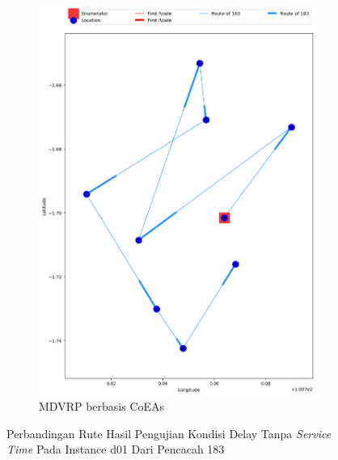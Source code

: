 \begin{figure}[H]
	\centering
	\begin{subfigure}[t]{\textwidth}
		\centering
		\includegraphics[width=\textwidth]{Resources/Images/delayed_1/real_m15_n100_delayed_1_183_coes}
		\caption{MDVRP berbasis CoEAs}
		\label{fig:real_m15_n100_delayed_1_183_coes}
	\end{subfigure}
	\caption{Perbandingan Rute Hasil Pengujian Kondisi Delay Tanpa \textit{Service Time} Pada Instance d01 Dari Pencacah 183}
	\label{fig:real_m15_n100_delayed_1_183}
\end{figure}


